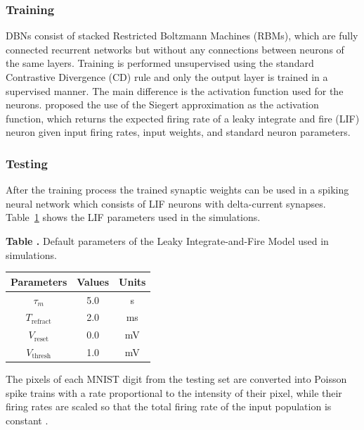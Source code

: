 \subsubsection{Training}

DBNs consist of stacked Restricted Boltzmann Machines (RBMs), which are fully connected recurrent networks but without any connections between neurons of the same layers. Training is performed unsupervised using the standard Contrastive Divergence (CD) rule \citep{Hinton_Contr_Divergence2006} and only the output layer is trained in a supervised manner. The main difference is the activation function used for the neurons. \citet{10.3389/fnins.2013.00178} proposed the use of the Siegert approximation \citep{Jug_etal_2012} as the activation function, which returns the expected firing rate of a leaky integrate and fire (LIF) neuron given input firing rates, input weights, and standard neuron parameters.

\subsubsection{Testing}
After the training process the trained synaptic weights can be used in a spiking neural network which consists of LIF neurons with delta-current synapses. Table~\ref{Tab:NeuralParams} shows the LIF parameters used in the simulations.

\begin{table}[htb!]
\textbf{\label{Tab:NeuralParams} Table .}{ Default parameters of the Leaky Integrate-and-Fire Model used in simulations.}

\processtable{}
{\begin{tabular}{c|c|c} %
Parameters & Values & Units \\
\hline
$\tau_{m}$ 		 & 5.0 & s  \\
$T_{\mathrm{refract}}$ & 2.0 & ms \\
$V_{\mathrm{reset}}$ 		 & 0.0 & mV \\
$V_{\mathrm{thresh}}$ 		 & 1.0 & mV \\
\end{tabular}}{}
\end{table}


The pixels of each MNIST digit from the testing set are converted into Poisson spike trains with a rate proportional to the intensity of their pixel, while their firing rates are scaled so that the total firing rate of the input population is constant \citep{10.3389/fnins.2013.00178}.


